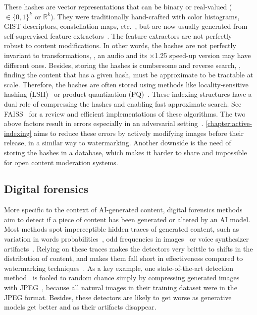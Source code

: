 These hashes are vector representations that can be binary or real-valued ($\in \{0,1\}^k $ or $\mathbb{R}^k$).
They were traditionally hand-crafted with color histograms, GIST descriptors, constellation maps, etc.~\citep{swain1991color, oliva2001modeling, wang2003industrial, perronnin2010large}, but are now usually generated from self-supervised feature extractors~\citep{chen2020simclr,oquab2023dinov2, devlin2018bert, hsu2021hubert, raffel2020exploring}.
The feature extractors are not perfectly robust to content modifications.
In other words, the hashes are not perfectly invariant to transformations, \eg, an audio and its $\times$1.25 speed-up version may have different ones.
Besides, storing the hashes is cumbersome and reverse search, \ie, finding the content that has a given hash, must be approximate to be tractable at scale.
Therefore, the hashes are often stored using methods like locality-sensitive hashing (LSH)~\citep{charikar2002similarity, datar2004locality} or product quantization (PQ)~\citep{jegou2010pq}.
These indexing structures have a dual role of compressing the hashes and enabling fast approximate search.
See \Gls*{FAISS}~\citep{douze2024faiss} for a review and efficient implementations of these algorithms.
The two above factors result in errors especially in an adversarial setting~\citep{douze20212021, papakipos2022results, wang2022benchmark}.
\autoref{chapter:active-indexing} aims to reduce these errors by actively modifying images before their release, in a similar way to watermarking.
Another downside is the need of storing the hashes in a database, which makes it harder to share and impossible for open content moderation systems.


\subsection{Digital forensics}

More specific to the context of AI-generated content, \gls*{digital forensics} methods aim to detect if a piece of content has been generated or altered by an AI model.
Most methods spot imperceptible hidden traces of generated content, such as variation in words probabilities~\citep{mitchell2023detectgpt}, odd frequencies in images~\citep{corvi2023detection} or voice synthesizer artifacts~\citep{le2023voicebox}.
Relying on these traces makes the detectors very brittle to shifts in the distribution of content, and makes them fall short in effectiveness compared to watermarking techniques~\citep{sadasivan2023can, saberi2023robustness}.
As a key example, one state-of-the-art detection method~\citep{wang2023dire} is fooled to random chance simply by compressing generated images with JPEG~\citep{grommelt2024fake}, because all natural images in their training dataset were in the JPEG format.
Besides, these detectors are likely to get worse as generative models get better and as their artifacts disappear. 

